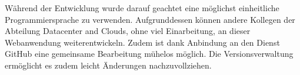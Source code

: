 Während der Entwicklung wurde darauf geachtet eine möglichst einheitliche Programmiersprache zu verwenden.
Aufgrunddessen können andere Kollegen der Abteilung Datacenter and Clouds, ohne viel Einarbeitung, an dieser Webanwendung weiterentwickeln.
Zudem ist dank Anbindung an den Dienst GitHub eine gemeinsame Bearbeitung mühelos möglich.
Die Versionsverwaltung ermöglicht es zudem leicht Änderungen nachzuvollziehen.







